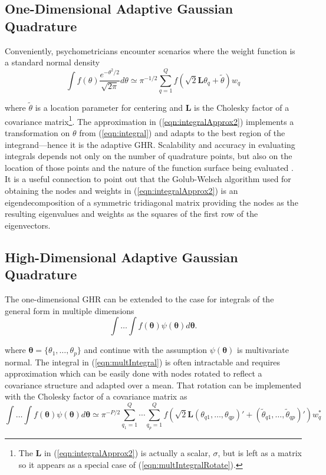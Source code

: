 \documentclass[12pt]{article}
\begin{document}
\subsection*{One-Dimensional Adaptive Gaussian Quadrature}

Conveniently, psychometricians encounter scenarios where the weight function is a standard normal density
\begin{equation}
\label{eqn:integralApprox2}
\int f(\theta)\frac{e^{-\theta^2/2}}{\sqrt{2\pi}} d\theta \simeq \pi^{-1/2}\sum_{q=1}^Q f(\sqrt{2}\bm{L}\theta_q+\widetilde{\theta})w_q
\end{equation}

\noindent where $\widetilde{\theta}$ is a location parameter for centering \cite{liu:pierce} and $\bm{L}$ is the Cholesky factor of a covariance matrix\footnote{The $\bm{L}$ in (\ref{eqn:integralApprox2}) is actually a scalar, $\sigma$, but is left as a matrix so it appears as a special case of (\ref{eqn:multIntegralRotate}).}. The approximation in (\ref{eqn:integralApprox2}) implements a transformation on $\theta$ from (\ref{eqn:integral}) and adapts to the best region of the integrand---hence it is the adaptive GHR. Scalability and accuracy in evaluating integrals depends not only on the number of quadrature points, but also on the location of those points and the nature of the function surface being evaluated \cite{Lesaffre}. It is a useful connection to point out that the Golub-Welsch algorithm \cite{golub} used for obtaining the nodes and weights in (\ref{eqn:integralApprox2}) is an eigendecomposition of a symmetric tridiagonal matrix providing the nodes as the resulting eigenvalues and weights as the squares of the first row of the eigenvectors.

\subsection*{High-Dimensional Adaptive Gaussian Quadrature}

The one-dimensional GHR can be extended to the case for integrals of the general form in multiple dimensions 
\begin{equation}
\label{eqn:multIntegral}
\int \ldots \int f(\bm{\theta}) \psi(\bm{\theta}) d\bm{\theta}.
\end{equation}

\noindent where $\bm{\theta} = \{\theta_{1}, \ldots, \theta_{p}\}$ and continue with the assumption $\psi(\bm{\theta})$ is multivariate normal. The integral in (\ref{eqn:multIntegral}) is often intractable and requires approximation which can be easily done with nodes rotated to reflect a covariance structure and adapted over a mean. That rotation can be implemented with the Cholesky factor of a covariance matrix as \cite{chowdhary,jackel,judd,stringer} 
\begin{equation}
\label{eqn:multIntegralRotate}
\int \ldots \int f(\bm{\theta})\psi(\bm{\theta}) d\bm{\theta}  \simeq  \pi^{-P/2}\sum_{q_1=1}^{Q} \cdots \sum_{q_p=1}^{Q} f(\sqrt{2}\bm{L}(\theta_{q1}, \ldots, \theta_{qp})' + (\widetilde{\theta}_{q1}, \ldots, \widetilde{\theta}_{qp})')w_q^*
\end{equation}
 
\end{document}
